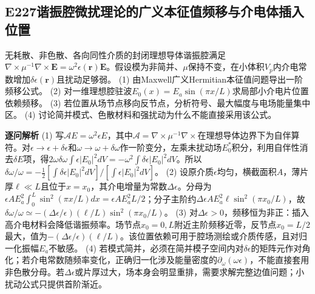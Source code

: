 \subsection*{E227\quad 谐振腔微扰理论的广义本征值频移与介电体插入位置}
无耗散、非色散、各向同性介质的封闭理想导体谐振腔满足$\nabla\times\mu^{-1}\nabla\times\boldsymbol E=\omega^2\epsilon(\boldsymbol r)\boldsymbol E$。假设模为非简并、$\mu$保持不变，在小体积$V_p$内介电常数增加$\delta\epsilon(\boldsymbol r)$且扰动足够弱。
(1) 由Maxwell广义Hermitian本征值问题导出一阶频移公式。
(2) 对一维理想腔驻波$E_0(x)=E_a\sin(\pi x/L)$求局部小介电片位置依赖频移。
(3) 若位置从场节点移向反节点，分析符号、最大幅度与电场能量集中区。
(4) 讨论简并模式、色散材料和强扰动为什么不能直接采用该公式。
\par\textbf{逐问解析}
(1) 写$\mathcal A E=\omega^2\epsilon E$，其中$\mathcal A=\nabla\times\mu^{-1}\nabla\times$在理想导体边界下为自伴算符。对$\epsilon\to\epsilon+\delta\epsilon$和$\omega\to\omega+\delta\omega$作一阶变分，左乘未扰动场$E_0^*$积分，利用自伴性消去$\delta E$项，得$2\omega\delta\omega\int\epsilon|E_0|^2dV=-\omega^2\int\delta\epsilon|E_0|^2dV$。所以$\delta\omega/\omega=-\frac12[\int\delta\epsilon|E_0|^2dV]/[\int\epsilon|E_0|^2dV]$。
(2) 设原介质$\epsilon$均匀，横截面积$A$，薄片厚$\ell\ll L$且位于$x=x_0$，其介电增量为常数$\Delta\epsilon$。分母为$\epsilon A E_a^2\int_0^L\sin^2(\pi x/L)dx=\epsilon A E_a^2L/2$；分子主阶约$\Delta\epsilon A E_a^2\ell\sin^2(\pi x_0/L)$，故$\delta\omega/\omega\simeq-(\Delta\epsilon/\epsilon)(\ell/L)\sin^2(\pi x_0/L)$。
(3) 对$\Delta\epsilon>0$，频移恒为非正：插入高介电材料会降低谐振频率。场节点$x_0=0,L$附近主阶频移近零，反节点$x_0=L/2$最大，值为$-(\Delta\epsilon/\epsilon)(\ell/L)$。该位置依赖可用于腔场测绘或介质传感，且对归一化振幅$E_a$不敏感。
(4) 若模式简并，必须在简并模子空间内对$\delta\epsilon$的矩阵元作对角化；若介电常数随频率变化，正确归一化涉及能量密度的$\partial_\omega(\omega\epsilon)$，不能直接套用非色散分母。若$\Delta\epsilon$或片厚过大，场本身会明显重排，需要求解完整边值问题；小扰动公式只提供首阶渐近。
\par\medskip
